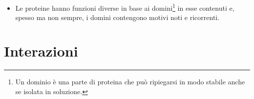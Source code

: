 \documentclass{beamer}
\begin{document}
\begin{frame}
  \begin{itemize}
  \item   	Le proteine hanno funzioni diverse in base ai domini\footnote{Un dominio è una parte di proteina che può ripiegarsi in modo stabile anche se isolata in soluzione.} 
		in esse contenuti e, spesso ma non sempre, i domini contengono motivi noti e ricorrenti.
\end{itemize}

\end{frame}


\section{Interazioni}
\end{document}
